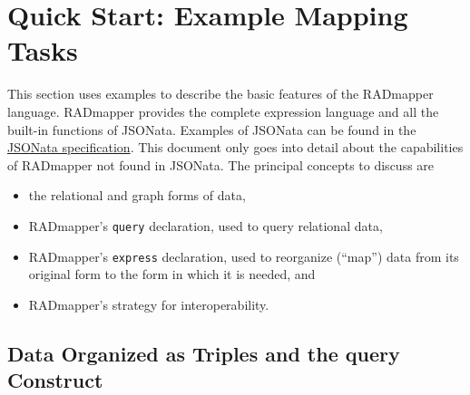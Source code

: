 \documentclass[9pt,letterpaper]{article}
\newcommand{\stt}[1]{\texttt{#1}} %
\begin{document}


\section{Quick Start: Example Mapping Tasks}

This section uses examples to describe the basic features of the RADmapper language.
RADmapper provides the complete expression language and all the built-in functions of JSONata.
Examples of JSONata can be found in the \href{https://jsonata.org/}{JSONata specification}.
This document only goes into detail about the capabilities of RADmapper not found in JSONata.
The principal concepts to discuss are

\begin{itemize}
  \item{the relational and graph forms of data,}
  \item{RADmapper's \stt{query} declaration, used to query relational data,}
  \item{RADmapper's \stt{express} declaration, used to reorganize (``map'') data from its original form to the form in which it is needed, and}
  \item{RADmapper's strategy for interoperability.}
\end{itemize}


\subsection{Data Organized as Triples and the query Construct}
\end{document}
